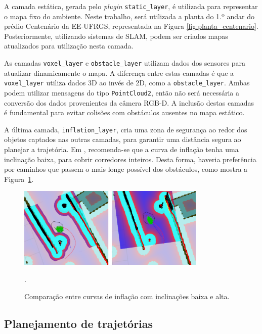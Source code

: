 \documentclass[repeatfields,xlists,xpacks,oneside,yearsonly]{ufrgscca}
\begin{document}
A camada estática, gerada pelo \textit{plugin} \texttt{static\_layer},
é utilizada para representar o mapa fixo do ambiente.
Neste trabalho, será utilizada a planta do 1.º andar do prédio Centenário da EE-UFRGS,
representada na Figura \ref{fig:planta_centenario}.
Posteriormente, utilizando sistemas de SLAM, podem ser criados mapas atualizados
para utilização nesta camada.

As camadas \texttt{voxel\_layer} e \texttt{obstacle\_layer} utilizam dados dos
sensores para atualizar dinamicamente o mapa.
A diferença entre estas camadas é que a \texttt{voxel\_layer} utiliza dados 3D
ao invés de 2D, como a \texttt{obstacle\_layer}. Ambas podem utilizar mensagens
do tipo \texttt{PointCloud2}, então não será necessária a conversão dos
dados provenientes da câmera RGB-D.
A inclusão destas camadas é fundamental para evitar colisões com obstáculos
ausentes no mapa estático.

A última camada, \texttt{inflation\_layer}, cria uma zona de segurança ao redor
dos objetos captados nas outras camadas, para garantir uma distância segura
ao planejar a trajetória.
Em \textcite{ros_tuning_guide}, recomenda-se que a curva de inflação tenha uma
inclinação baixa, para cobrir corredores inteiros.
Desta forma, haveria preferência por caminhos que passem o mais longe possível
dos obstáculos, como mostra a Figura~\ref{fig:inflation_layer}.

\begin{figure}[htbp]
    {
        \centering
        \caption{Comparação entre curvas de inflação com inclinações baixa e alta.}
        \label{fig:inflation_layer}
        \includegraphics[width=0.8\textwidth]{inflation_layer.png}\\
    }
    {.}
\end{figure}

\subsection{Planejamento de trajetórias}
\end{document}

